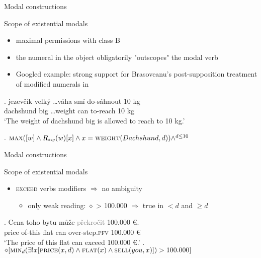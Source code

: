 \documentclass[12pt]{beamer}
\begin{document}
\begin{frame}{Modal constructions}

Scope of existential modals

\begin{itemize}
\item maximal permissions with class B
\item the numeral in the object obligatorily "outscopes" the modal verb
\item Googled example: strong support for Brasoveanu's post-supposition treatment of modified numerals in \NNext
\end{itemize}

\exg. jezevčík velký \ldots  váha smí do-sáhnout 10 kg\\
dachshund big \ldots weight can to-reach 10 kg\\
`The weight of dachshund big is allowed to reach to 10 kg.'

\ex. $\textsc{max}([w]\wedge R_{*w}(w) [x] \wedge x=\textsc{weight}(Dachshund,d)) \wedge ^{d \leq 10}$

\end{frame}

\begin{frame}{Modal constructions}

Scope of existential modals

\begin{itemize}
\item \textsc{exceed} verbs modifiers $\Rightarrow$ no ambiguity
\begin{itemize}
\item only weak reading: $\diamond$ > 100.000 $\Rightarrow$ true in $< d$ and $\geq d$ 
\end{itemize}
\end{itemize}

\exg. Cena toho bytu může \textcolor{gray}{překročit} 100.000 {\euro}.\label{ex:classA-prefix}\\
price of-this flat can over-step.\textsc{pfv} 100.000 {\euro}\\
`The price of this flat can exceed 100.000 {\euro}.'
\a. $\diamond[\textsc{min}_d(\exists !x[\textsc{price}(x,d) \wedge \textsc{flat}(x) \wedge \textsc{sell}(you,x)]) > 100.000]$

\end{frame}
\end{document}
